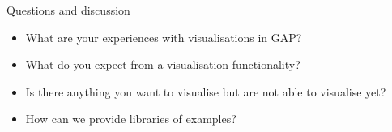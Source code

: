 \documentclass{beamer}
\theoremstyle{plain}
\begin{document}
\begin{frame}{Questions and discussion}
    \begin{itemize}
        \item What are your experiences with visualisations in GAP?
        \item What do you expect from a visualisation functionality?
        \item Is there anything you want to visualise but are not able to visualise yet?
        \item How can we provide libraries of examples?
    \end{itemize}
\end{frame}
\end{document}
